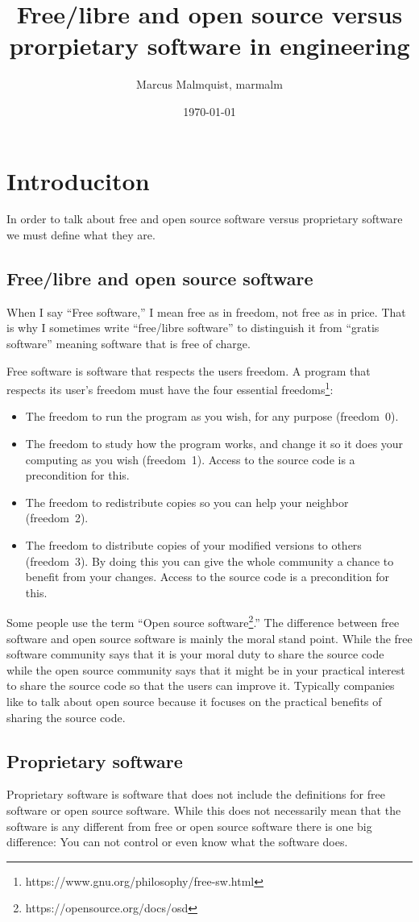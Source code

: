 \documentclass[12pt,a4paper]{article}
\title{Free/libre and open source versus prorpietary software in engineering}
\author{Marcus Malmquist, marmalm}
\date{\today}
\begin{document}
\maketitle

\section{Introduciton}
In order to talk about free and open source software versus proprietary software we must define what they are.
\subsection{Free/libre and open source software}\label{sec:free}
When I say ``Free software,'' I mean free as in freedom, not free as in price. That is why I sometimes write ``free/libre software'' to distinguish it from ``gratis software'' meaning software that is free of charge.

Free software is software that respects the users freedom. A program that respects its user's freedom must have the four essential freedoms\footnote{https://www.gnu.org/philosophy/free-sw.html}:
\begin{itemize}
\item The freedom to run the program as you wish, for any purpose (freedom~0).
\item The freedom to study how the program works, and change it so it does your computing as you wish (freedom~1). Access to the source code is a precondition for this.
\item The freedom to redistribute copies so you can help your neighbor (freedom~2).
\item The freedom to distribute copies of your modified versions to others (freedom~3). By doing this you can give the whole community a chance to benefit from your changes. Access to the source code is a precondition for this.
\end{itemize}
Some people use the term ``Open source software\footnote{https://opensource.org/docs/osd}.'' The difference between free software and open source software is mainly the moral stand point. While the free software community says that it is your moral duty to share the source code while the open source community says that it might be in your practical interest to share the source code so that the users can improve it. Typically companies like to talk about open source because it focuses on the practical benefits of sharing the source code.
\subsection{Proprietary software}
Proprietary software is software that does not include the definitions for free software or open source software. While this does not necessarily mean that the software is any different from free or open source software there is one big difference: You can not control or even know what the software does.
\end{document}
